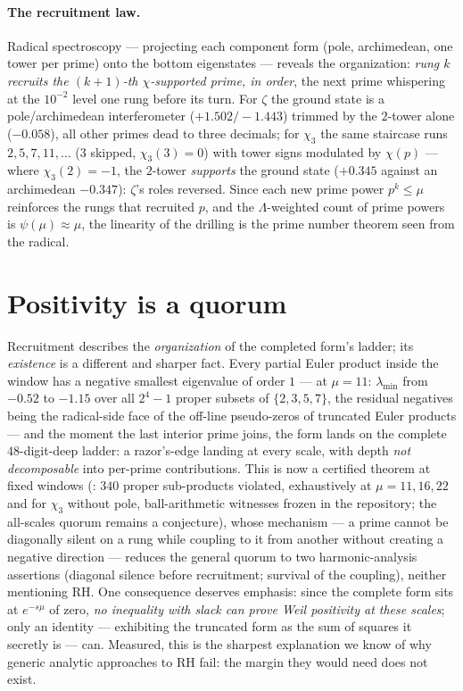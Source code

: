 \documentclass[10pt]{article}
\begin{document}
\paragraph{The recruitment law.} Radical spectroscopy --- projecting each
component form (pole, archimedean, one tower per prime) onto the bottom
eigenstates --- reveals the organization: \emph{rung $k$ recruits the
$(k{+}1)$-th $\chi$-supported prime, in order}, the next prime whispering
at the $10^{-2}$ level one rung before its turn. For $\zeta$ the ground
state is a pole/archimedean interferometer ($+1.502/-1.443$) trimmed by
the $2$-tower alone ($-0.058$), all other primes dead to three decimals;
for $\chi_3$ the same staircase runs $2,5,7,11,\dots$ ($3$ skipped,
$\chi_3(3)=0$) with tower signs modulated by $\chi(p)$ --- where
$\chi_3(2)=-1$, the $2$-tower \emph{supports} the ground state
($+0.345$ against an archimedean $-0.347$): $\zeta$'s roles reversed.
Since each new prime power $p^k\le\mu$ reinforces the rungs that
recruited $p$, and the $\Lambda$-weighted count of prime powers is
$\psi(\mu)\approx\mu$, the linearity of the drilling is the prime number
theorem seen from the radical.

\section{Positivity is a quorum}

Recruitment describes the \emph{organization} of the completed form's
ladder; its \emph{existence} is a different and sharper fact. Every
partial Euler product inside the window has a negative smallest
eigenvalue of order $1$ --- at $\mu=11$: $\lambda_{\min}$ from $-0.52$ to
$-1.15$ over all $2^4-1$ proper subsets of $\{2,3,5,7\}$, the residual
negatives being the radical-side face of the off-line pseudo-zeros of
truncated Euler products --- and the moment the last interior prime
joins, the form lands on the complete $48$-digit-deep ladder: a
razor's-edge landing at every scale, with depth \emph{not decomposable}
into per-prime contributions. This is now a certified theorem at fixed windows
(\cite{Quorum}: $340$ proper sub-products violated, exhaustively at
$\mu=11,16,22$ and for $\chi_3$ without pole, ball-arithmetic witnesses
frozen in the repository; the all-scales quorum remains a conjecture), whose mechanism --- a prime cannot be
diagonally silent on a rung while coupling to it from another without
creating a negative direction --- reduces the general quorum to two
harmonic-analysis assertions (diagonal silence before recruitment;
survival of the coupling), neither mentioning RH. One consequence
deserves emphasis: since the complete form sits at $e^{-s\mu}$ of zero,
\emph{no inequality with slack can prove Weil positivity at these
scales}; only an identity --- exhibiting the truncated form as the sum
of squares it secretly is --- can. Measured, this is the sharpest
explanation we know of why generic analytic approaches to RH fail: the
margin they would need does not exist.
\end{document}
